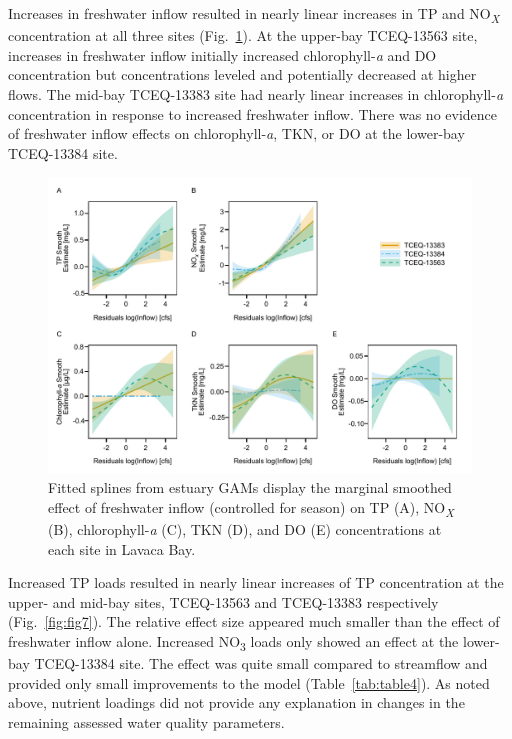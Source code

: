 \documentclass[fleqn,10pt,lineno]{wlpeerj} %
\begin{document}
Increases in freshwater inflow resulted in nearly linear increases in TP
and NO\textsubscript{\emph{X}} concentration at all three sites
(Fig.~\ref{fig:fig6}). At the upper-bay TCEQ-13563 site, increases in
freshwater inflow initially increased chlorophyll-\emph{a} and DO
concentration but concentrations leveled and potentially decreased at
higher flows. The mid-bay TCEQ-13383 site had nearly linear increases in
chlorophyll-\emph{a} concentration in response to increased freshwater
inflow. There was no evidence of freshwater inflow effects on
chlorophyll-\emph{a}, TKN, or DO at the lower-bay TCEQ-13384 site.

\begin{figure}

{\centering \includegraphics[width=1\linewidth,]{Schramm-2023-08-PeerJ_files/figure-latex/fig6} 

}

\caption{Fitted splines from estuary GAMs display the marginal smoothed effect of freshwater inflow (controlled for season) on TP (A), NO\textit{\textsubscript{X}} (B), chlorophyll-\textit{a} (C), TKN (D), and DO (E) concentrations at each site in Lavaca Bay.}\label{fig:fig6}
\end{figure}

Increased TP loads resulted in nearly linear increases of TP
concentration at the upper- and mid-bay sites, TCEQ-13563 and TCEQ-13383
respectively (Fig.~\ref{fig:fig7}). The relative effect size appeared
much smaller than the effect of freshwater inflow alone. Increased
NO\textsubscript{3} loads only showed an effect at the lower-bay
TCEQ-13384 site. The effect was quite small compared to streamflow and
provided only small improvements to the model (Table~\ref{tab:table4}).
As noted above, nutrient loadings did not provide any explanation in
changes in the remaining assessed water quality parameters.
\end{document}
